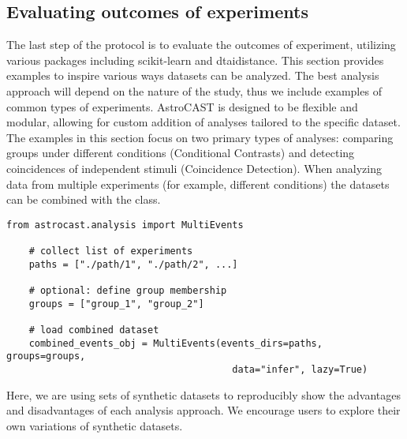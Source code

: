 \subsection{Evaluating outcomes of experiments}

The last step of the protocol is to evaluate the outcomes of experiment, utilizing various packages including scikit-learn and dtaidistance\citep{pedregosa_scikit-learn_2011,meert_wannes_dtaidistance_2020,mcinnes_umap_2018,mcinnes_hdbscan_2017}. This section provides examples to inspire various ways datasets can be analyzed. The best analysis approach will depend on the nature of the study, thus we include examples of common types of experiments. AstroCAST is designed to be flexible and modular, allowing for custom addition of analyses tailored to the specific dataset. The examples in this section focus on two primary types of analyses: comparing groups under different conditions (Conditional Contrasts) and detecting coincidences of independent stimuli (Coincidence Detection). When analyzing data from multiple experiments (for example, different conditions) the datasets can be combined with the  class.

\begin{lstlisting}[style=pyStyle]
    from astrocast.analysis import MultiEvents

    # collect list of experiments
    paths = ["./path/1", "./path/2", ...]

    # optional: define group membership
    groups = ["group_1", "group_2"]

    # load combined dataset
    combined_events_obj = MultiEvents(events_dirs=paths, groups=groups,
                                        data="infer", lazy=True)
\end{lstlisting}

Here, we are using sets of synthetic datasets to reproducibly show the advantages and disadvantages of each analysis approach. We encourage users to explore their own variations of synthetic datasets.


